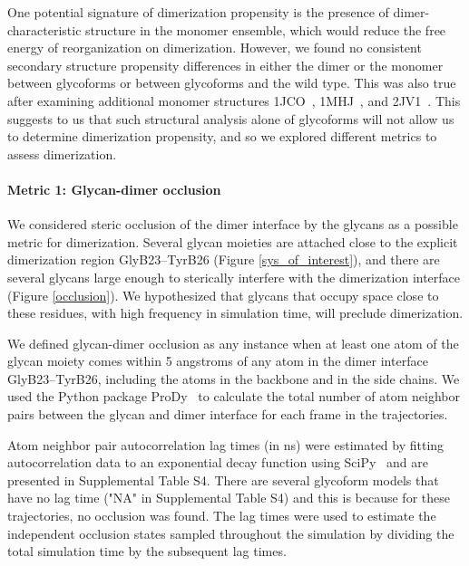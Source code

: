 \documentclass[sn-vancouver]{sn-jnl}
\begin{document}
One potential signature of dimerization propensity is the presence of dimer-characteristic structure in the monomer ensemble, which would reduce the free energy of reorganization on dimerization. However, we found no consistent secondary structure propensity differences in either the dimer or the monomer between glycoforms or between glycoforms and the wild type. This was also true after examining additional monomer structures 1JCO~\cite{keller2001flexibility}, 1MHJ~\cite{jorgensen1996solution}, and 2JV1~\cite{bocian2008structure}. This suggests to us that such structural analysis alone of glycoforms will not allow us to determine dimerization propensity, and so we explored different metrics to assess dimerization.
\paragraph{Metric 1: Glycan-dimer occlusion}
We considered steric occlusion of the dimer interface by the glycans as a possible metric for dimerization. Several glycan moieties are attached close to the explicit dimerization region GlyB23--TyrB26 (Figure \ref{sys_of_interest}), and there are several glycans large enough to sterically interfere with the dimerization interface (Figure \ref{occlusion}). We hypothesized that glycans that occupy space close to these residues, with high frequency in simulation time, will preclude dimerization.

We defined glycan-dimer occlusion as any instance when at least one atom of the glycan moiety comes within 5 angstroms of any atom in the dimer interface GlyB23--TyrB26, including the atoms in the backbone and in the side chains. We used the Python package ProDy~\cite{bakan2011prody} to calculate the total number of atom neighbor pairs between the glycan and dimer interface for each frame in the trajectories.

Atom neighbor pair autocorrelation lag times (in ns) were estimated by fitting autocorrelation data to an exponential decay function using SciPy~\cite{scipy2020pub, numpy2020pub} and are presented in Supplemental Table S4. There are several glycoform models that have no lag time ("NA" in Supplemental Table S4) and this is because for these trajectories, no occlusion was found. The lag times were used to estimate the independent occlusion states sampled throughout the simulation by dividing the total simulation time by the subsequent lag times.
\end{document}
